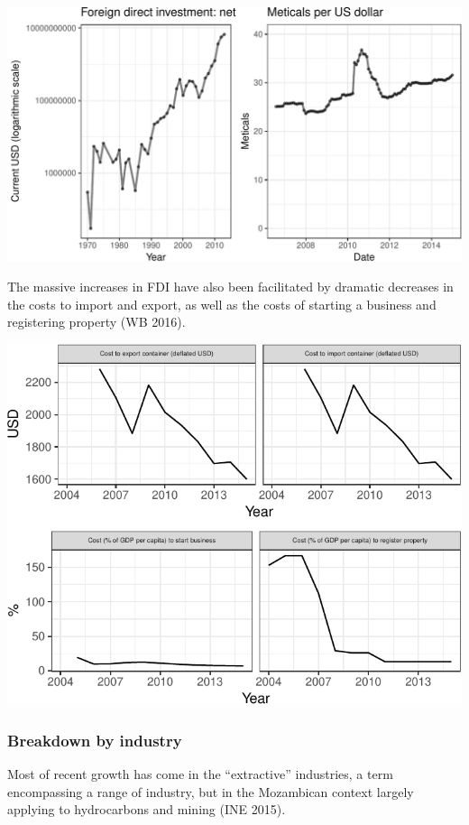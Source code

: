 \documentclass[]{article}
\begin{document}
\begin{center}\includegraphics{figures/unnamed-chunk-10-1} \end{center}

The massive increases in FDI have also been facilitated by dramatic
decreases in the costs to import and export, as well as the costs of
starting a business and registering property (WB 2016).

\begin{center}\includegraphics{figures/unnamed-chunk-11-1} \end{center}

\subsubsection{Breakdown by industry}\label{breakdown-by-industry}

Most of recent growth has come in the ``extractive'' industries, a term
encompassing a range of industry, but in the Mozambican context largely
applying to hydrocarbons and mining (INE 2015).
\end{document}

